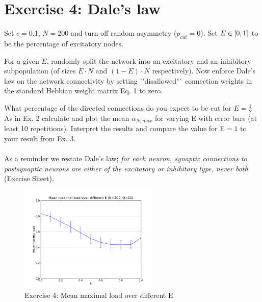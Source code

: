 \section{Exercise 4: Dale's law}

\begin{itshape}
\small
Set $c=0.1$, $N = 200$ and turn off random asymmetry ($p_{cut} = 0$). Set $E \in \left[0, 1\right]$ to be the percentage of excitatory nodes.

For a given $E$, randomly split the network into an excitatory and an inhibitory subpopulation (of sizes $E \cdot N$ and $(1 - E) \cdot N$ respectively). Now enforce Dale's law on the network connectivity by setting '"disallowed"` connection weights in the standard Hebbian weight matrix Eq. 1 to zero.

What percentage of the directed connections do you expect to be cut for $E = \frac{1}{2}$
As in Ex. 2 calculate and plot the mean $\alpha_{N,max}$ for varying E with error bars (at least 10 repetitions). Interpret the results and compare the value for E$ = 1$ to your result from Ex. 3.
\end{itshape}

\paragraph*{}

As a reminder we restate Dale's law; \textit{for each neuron, synaptic connections to postsynaptic neurons are either of the excitatory or inhibitory type, never both} (Execise Sheet).

\begin{figure}[H]
  \begin{center}
    \includegraphics[width=0.6\textwidth]{dat/ex4-mean_max_load-N200-Q50-C95.png}
  \end{center}
  \vspace{-20pt}
  \caption{Exercise 4: Mean maximal load over different E}
  \label{fig: exercise 4}
\end{figure}


